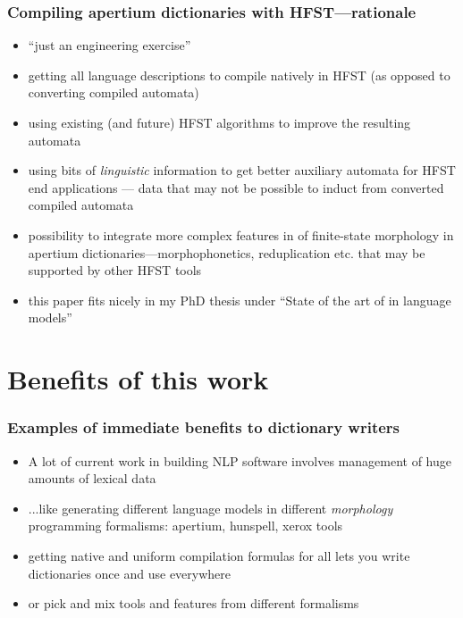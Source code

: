 \documentclass{beamer}
\begin{document}
\begin{frame}
    \frametitle{Compiling apertium dictionaries with HFST---rationale}
    \begin{itemize}
        \item ``just an engineering exercise''
        \item getting all language descriptions to compile natively in HFST (as
            opposed to converting compiled automata)
        \item using existing (and future) HFST algorithms to improve the
            resulting automata
        \item using bits of \emph{linguistic} information to get better
            auxiliary automata for HFST end applications --- data that may not
            be possible to induct from converted compiled automata
        \item possibility to integrate more complex features in of finite-state
            morphology in apertium dictionaries---morphophonetics, reduplication
            etc. that may be supported by other HFST tools
        \item this paper fits nicely in my PhD thesis under ``State of the art of
            in language models''
    \end{itemize}
\end{frame}

\section{Benefits of this work}

\begin{frame}
    \frametitle{Examples of immediate benefits to dictionary writers}
    \begin{itemize}
        \item A lot of current work in building NLP software involves management
            of huge amounts of lexical data
        \item ...like generating different language models in different
            \emph{morphology} programming formalisms: apertium, hunspell,
            xerox tools
        \item getting native and uniform compilation formulas for all lets
            you \alert{write dictionaries once} and use everywhere
        \item or pick and mix tools and features from different formalisms
    \end{itemize}
\end{frame}
\end{document}
